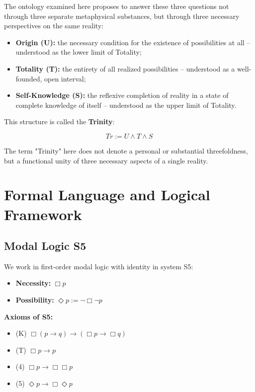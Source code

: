 \documentclass[
]{article}
\begin{document}
The ontology examined here proposes to answer these three questions not through three separate metaphysical substances, but through three necessary perspectives on the same reality:

\begin{itemize}
\item \textbf{Origin (U):} the necessary condition for the existence of possibilities at all – understood as the lower limit of Totality;
\item \textbf{Totality (T):} the entirety of all realized possibilities – understood as a well-founded, open interval;
\item \textbf{Self-Knowledge (S):} the reflexive completion of reality in a state of complete knowledge of itself – understood as the upper limit of Totality.
\end{itemize}

This structure is called the \textbf{Trinity}:

\[
Tr := U \land T \land S
\]

The term "Trinity" here does not denote a personal or substantial threefoldness, but a functional unity of three necessary aspects of a single reality.

\section{Formal Language and Logical Framework}\label{formal-language-and-logical-framework}

\subsection{Modal Logic S5}\label{modal-logic-s5}

We work in first-order modal logic with identity in system S5:

\begin{itemize}
\item \textbf{Necessity:} \(\Box p\)
\item \textbf{Possibility:} \(\Diamond p := \neg\Box\neg p\)
\end{itemize}

\textbf{Axioms of S5:}
\begin{itemize}
\item (K) \(\Box(p \rightarrow q) \rightarrow (\Box p \rightarrow \Box q)\)
\item (T) \(\Box p \rightarrow p\)
\item (4) \(\Box p \rightarrow \Box\Box p\)
\item (5) \(\Diamond p \rightarrow \Box\Diamond p\)
\end{itemize}
\end{document}
